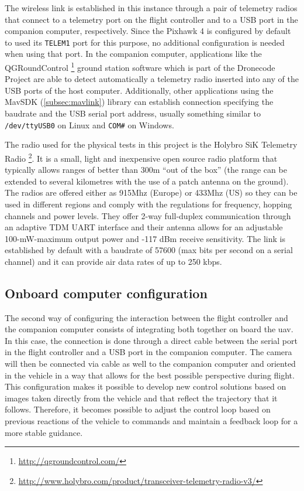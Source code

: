 The wireless link is established in this instance through a pair of telemetry radios that connect to a telemetry port on the flight controller and to a USB port in the companion computer, respectively.
Since the Pixhawk 4 is configured by default to used its \verb|TELEM1| port for this purpose, no additional configuration is needed when using that port.
In the companion computer, applications like the QGRoundControl \footnote{\url{http://qgroundcontrol.com/}} ground station software which is part of the Dronecode Project are able to detect automatically a telemetry radio inserted into any of the USB ports of the host computer.
Additionally, other applications using the MavSDK (\ref{subsec:mavlink}) library can establish connection specifying the baudrate and the USB serial port address, usually something similar to \verb|/dev/ttyUSB0| on Linux and \verb|COM#| on Windows.

The radio used for the physical tests in this project is the Holybro SiK Telemetry Radio \footnote{\url{http://www.holybro.com/product/transceiver-telemetry-radio-v3/}}.
It is a small, light and inexpensive open source radio platform that typically allows ranges of better than 300m “out of the box” (the range can be extended to several kilometres with the use of a patch antenna on the ground).
The radios are offered either as 915Mhz (Europe) or 433Mhz (US) so they can be used in different regions and comply with the regulations for frequency, hopping channels and power levels.
They offer 2-way full-duplex communication through an adaptive TDM UART interface and their antenna allows for an adjustable 100-mW-maximum output power and -117 dBm receive sensitivity.
The link is established by default with a baudrate of 57600 (max bits per second on a serial channel) and it can provide air data rates of up to 250 kbps.


\subsection{Onboard computer configuration}
\label{subsec:onboard}

The second way of configuring the interaction between the flight controller and the companion computer consists of integrating both together on board the \gls{uav}.
In this case, the connection is done through a direct cable between the serial port in the flight controller and a USB port in the companion computer.
The camera will then be connected via cable as well to the companion computer and oriented in the vehicle in a way that allows for the best possible perspective during flight.
This configuration makes it possible to develop new control solutions based on images taken directly from the vehicle and that reflect the trajectory that it follows.
Therefore, it becomes possible to adjust the control loop based on previous reactions of the vehicle to commands and maintain a feedback loop for a more stable guidance.

